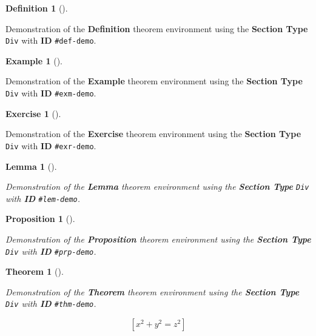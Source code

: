 \documentclass[
  10pt,
  oneside,
  cleardoublepage=empty,
  numbers=noenddot,
  titlepage,
  toclink=all,
  toc=bibliography,
  headinclude,
  footinclude]{scrbook}
\theoremstyle{plain}
\theoremstyle{plain}
\newtheorem{lemma}{Lemma}[section]
\theoremstyle{definition}
\newtheorem{example}{Example}[section]
\theoremstyle{definition}
\newtheorem{exercise}{Exercise}[section]
\theoremstyle{plain}
\newtheorem{proposition}{Proposition}[section]
\theoremstyle{plain}
\newtheorem{theorem}{Theorem}[section]
\theoremstyle{definition}
\newtheorem{definition}{Definition}[section]
\theoremstyle{plain}
\theoremstyle{remark}
\begin{document}
\begin{definition}[]\protect\hypertarget{def-demo}{}\label{def-demo}

Demonstration of the \textbf{Definition} theorem environment using the
\textbf{Section Type} \texttt{Div} with \textbf{ID} \texttt{\#def-demo}.

\end{definition}

\begin{example}[]\protect\hypertarget{exm-demo}{}\label{exm-demo}

Demonstration of the \textbf{Example} theorem environment using the
\textbf{Section Type} \texttt{Div} with \textbf{ID} \texttt{\#exm-demo}.

\end{example}

\begin{exercise}[]\protect\hypertarget{exr-demo}{}\label{exr-demo}

Demonstration of the \textbf{Exercise} theorem environment using the
\textbf{Section Type} \texttt{Div} with \textbf{ID} \texttt{\#exr-demo}.

\end{exercise}

\begin{lemma}[]\protect\hypertarget{lem-demo}{}\label{lem-demo}

Demonstration of the \textbf{Lemma} theorem environment using the
\textbf{Section Type} \texttt{Div} with \textbf{ID} \texttt{\#lem-demo}.

\end{lemma}

\begin{proposition}[]\protect\hypertarget{prp-demo}{}\label{prp-demo}

Demonstration of the \textbf{Proposition} theorem environment using the
\textbf{Section Type} \texttt{Div} with \textbf{ID} \texttt{\#prp-demo}.

\end{proposition}

\begin{theorem}[]\protect\hypertarget{thm-demo}{}\label{thm-demo}

Demonstration of the \textbf{Theorem} theorem environment using the
\textbf{Section Type} \texttt{Div} with \textbf{ID} \texttt{\#thm-demo}.

\[[ x^2 + y^2 = z^2 ]\]

\end{theorem}
\end{document}
